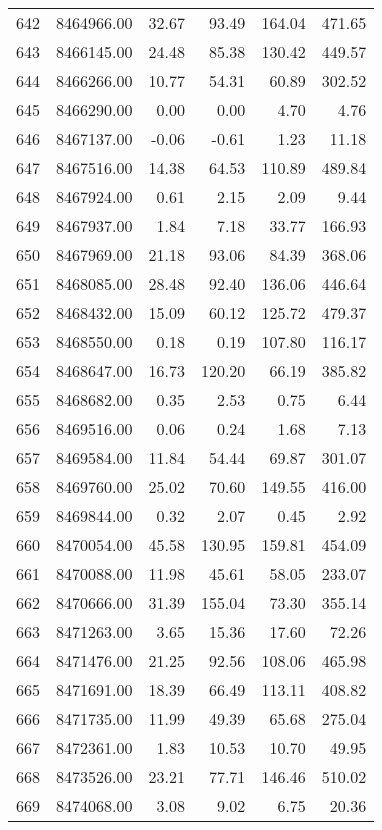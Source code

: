 \begin{table}[ht]
\begin{tabular}{rrrrrr}
  642 & 8464966.00 & 32.67 & 93.49 & 164.04 & 471.65 \\ 
  643 & 8466145.00 & 24.48 & 85.38 & 130.42 & 449.57 \\ 
  644 & 8466266.00 & 10.77 & 54.31 & 60.89 & 302.52 \\ 
  645 & 8466290.00 & 0.00 & 0.00 & 4.70 & 4.76 \\ 
  646 & 8467137.00 & -0.06 & -0.61 & 1.23 & 11.18 \\ 
  647 & 8467516.00 & 14.38 & 64.53 & 110.89 & 489.84 \\ 
  648 & 8467924.00 & 0.61 & 2.15 & 2.09 & 9.44 \\ 
  649 & 8467937.00 & 1.84 & 7.18 & 33.77 & 166.93 \\ 
  650 & 8467969.00 & 21.18 & 93.06 & 84.39 & 368.06 \\ 
  651 & 8468085.00 & 28.48 & 92.40 & 136.06 & 446.64 \\ 
  652 & 8468432.00 & 15.09 & 60.12 & 125.72 & 479.37 \\ 
  653 & 8468550.00 & 0.18 & 0.19 & 107.80 & 116.17 \\ 
  654 & 8468647.00 & 16.73 & 120.20 & 66.19 & 385.82 \\ 
  655 & 8468682.00 & 0.35 & 2.53 & 0.75 & 6.44 \\ 
  656 & 8469516.00 & 0.06 & 0.24 & 1.68 & 7.13 \\ 
  657 & 8469584.00 & 11.84 & 54.44 & 69.87 & 301.07 \\ 
  658 & 8469760.00 & 25.02 & 70.60 & 149.55 & 416.00 \\ 
  659 & 8469844.00 & 0.32 & 2.07 & 0.45 & 2.92 \\ 
  660 & 8470054.00 & 45.58 & 130.95 & 159.81 & 454.09 \\ 
  661 & 8470088.00 & 11.98 & 45.61 & 58.05 & 233.07 \\ 
  662 & 8470666.00 & 31.39 & 155.04 & 73.30 & 355.14 \\ 
  663 & 8471263.00 & 3.65 & 15.36 & 17.60 & 72.26 \\ 
  664 & 8471476.00 & 21.25 & 92.56 & 108.06 & 465.98 \\ 
  665 & 8471691.00 & 18.39 & 66.49 & 113.11 & 408.82 \\ 
  666 & 8471735.00 & 11.99 & 49.39 & 65.68 & 275.04 \\ 
  667 & 8472361.00 & 1.83 & 10.53 & 10.70 & 49.95 \\ 
  668 & 8473526.00 & 23.21 & 77.71 & 146.46 & 510.02 \\ 
  669 & 8474068.00 & 3.08 & 9.02 & 6.75 & 20.36 \\ 

\end{tabular}
\end{table}
